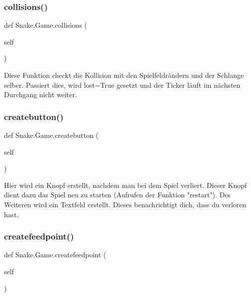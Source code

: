 \subsubsection{\texorpdfstring{collisions()}{collisions()}}
{\footnotesize\ttfamily def Snake.\+Game.\+collisions (\begin{DoxyParamCaption}\item[{}]{self }\end{DoxyParamCaption})}

\begin{DoxyVerb}Diese Funktion checkt die Kollision mit den Spielfeldrändern und der Schlange selber. 
Passiert dies, wird lost=True gesetzt und der Ticker läuft im nächsten
Durchgang nicht weiter.
\end{DoxyVerb}
 \mbox{\label{class_snake_1_1_game_aedca2341f309daf9d1fdd1c1b5fbbb74}} 
\subsubsection{\texorpdfstring{createbutton()}{createbutton()}}
{\footnotesize\ttfamily def Snake.\+Game.\+createbutton (\begin{DoxyParamCaption}\item[{}]{self }\end{DoxyParamCaption})}

\begin{DoxyVerb}Hier wird ein Knopf erstellt, nachdem man bei dem Spiel verliert.
Dieser Knopf dient dazu das Spiel neu zu starten (Aufrufen der Funktion "restart").
Des Weiteren wird ein Textfeld erstellt. Dieses benachrichtigt dich, dass du verloren hast.
\end{DoxyVerb}
 \mbox{\label{class_snake_1_1_game_a47967ef289465a984d6c86b34ead527e}} 
\subsubsection{\texorpdfstring{createfeedpoint()}{createfeedpoint()}}
{\footnotesize\ttfamily def Snake.\+Game.\+createfeedpoint (\begin{DoxyParamCaption}\item[{}]{self }\end{DoxyParamCaption})}

